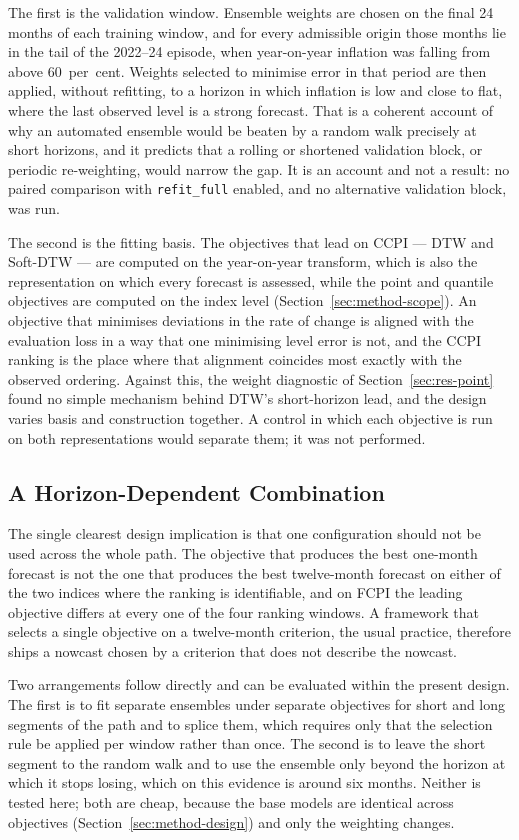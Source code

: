 \documentclass[12pt]{article}
\begin{document}
The first is the validation window. Ensemble weights are chosen on the final 24
months of each training window, and for every admissible origin those months lie
in the tail of the 2022--24 episode, when year-on-year inflation was falling
from above 60~per~cent. Weights selected to minimise error in that period are
then applied, without refitting, to a horizon in which inflation is low and
close to flat, where the last observed level is a strong forecast. That is a
coherent account of why an automated ensemble would be beaten by a random walk
precisely at short horizons, and it predicts that a rolling or shortened
validation block, or periodic re-weighting, would narrow the gap. It is an
account and not a result: no paired comparison with \texttt{refit\_full}
enabled, and no alternative validation block, was run.

The second is the fitting basis. The objectives that lead on CCPI --- DTW and
Soft-DTW --- are computed on the year-on-year transform, which is also the
representation on which every forecast is assessed, while the point and quantile
objectives are computed on the index level
(Section~\ref{sec:method-scope}). An objective that minimises deviations in the
rate of change is aligned with the evaluation loss in a way that one minimising
level error is not, and the CCPI ranking is the place where that alignment
coincides most exactly with the observed ordering. Against this, the weight
diagnostic of Section~\ref{sec:res-point} found no simple mechanism behind
DTW's short-horizon lead, and the design varies basis and construction together.
A control in which each objective is run on both representations would separate
them; it was not performed.

\subsection{A Horizon-Dependent Combination}

The single clearest design implication is that one configuration should not be
used across the whole path. The objective that produces the best one-month
forecast is not the one that produces the best twelve-month forecast on either
of the two indices where the ranking is identifiable, and on FCPI the leading
objective differs at every one of the four ranking windows. A framework that
selects a single objective on a twelve-month criterion, the usual practice,
therefore ships a nowcast chosen by a criterion that does not describe the
nowcast.

Two arrangements follow directly and can be evaluated within the present
design. The first is to fit separate ensembles under separate objectives for
short and long segments of the path and to splice them, which requires only
that the selection rule be applied per window rather than once. The second is
to leave the short segment to the random walk and to use the ensemble only
beyond the horizon at which it stops losing, which on this evidence is around
six months. Neither is tested here; both are cheap, because the base models are
identical across objectives (Section~\ref{sec:method-design}) and only the
weighting changes.
\end{document}
